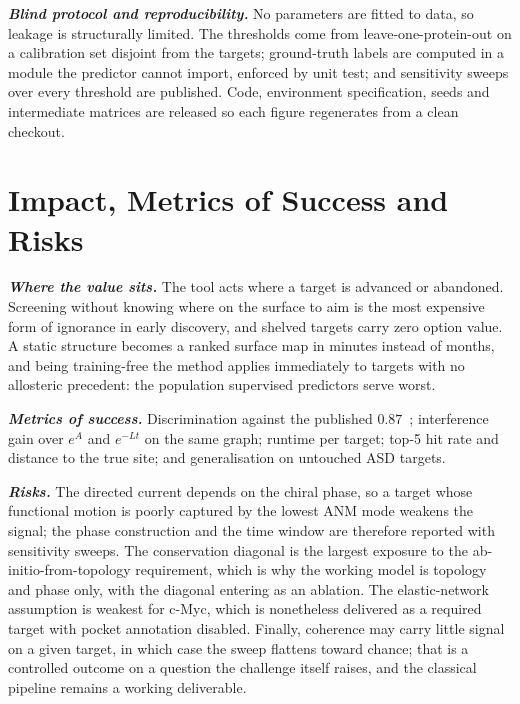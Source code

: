 \documentclass[10pt,a4paper]{article}
\newcommand{\lead}[1]{\textbf{\textit{#1}}}
\begin{document}
\lead{Blind protocol and reproducibility.} No parameters are fitted to data, so leakage is structurally limited. The thresholds come from
leave-one-protein-out on a calibration set disjoint from the targets; ground-truth labels are
computed in a module the predictor cannot import, enforced by unit test; and sensitivity sweeps over
every threshold are published. Code, environment specification, seeds and intermediate matrices are
released so each figure regenerates from a clean checkout.

\section{Impact, Metrics of Success and Risks}

\lead{Where the value sits.} The tool acts where a target is advanced or abandoned. Screening without
knowing where on the surface to aim is the most expensive form of ignorance in early discovery, and
shelved targets carry zero option value. A static structure becomes a ranked surface map in minutes
instead of months, and being training-free the method applies immediately to targets with no
allosteric precedent: the population supervised predictors serve worst.

\lead{Metrics of success.} Discrimination against the published $0.87$~\cite{meller2023};
interference gain over $e^{A}$ and $e^{-Lt}$ on the same graph; runtime per target; top-5 hit rate
and distance to the true site; and generalisation on untouched ASD targets.

\lead{Risks.} The directed current depends on the chiral phase, so a target whose functional motion
is poorly captured by the lowest ANM mode weakens the signal; the phase construction and the time
window are therefore reported with sensitivity sweeps. The conservation diagonal is the largest
exposure to the ab-initio-from-topology requirement, which is why the working model is topology and
phase only, with the diagonal entering as an ablation. The elastic-network assumption is weakest for
c-Myc, which is nonetheless delivered as a required target with pocket annotation disabled. Finally,
coherence may carry little signal on a given target, in which case the sweep flattens toward chance;
that is a controlled outcome on a question the challenge itself raises, and the classical pipeline
remains a working deliverable.
\end{document}
